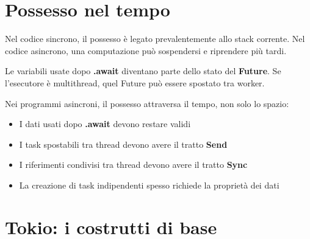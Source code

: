 \section{Possesso nel tempo}

Nel codice sincrono, il possesso è legato prevalentemente allo stack corrente.
Nel codice asincrono, una computazione può sospendersi e riprendere più tardi.

Le variabili usate dopo \textbf{.await} diventano parte dello stato del \textbf{Future}.
Se l'esecutore è multithread, quel Future può essere spostato tra worker.


Nei programmi asincroni, il possesso attraversa il tempo, non solo lo spazio:

\begin{itemize}
  \item I dati usati dopo \textbf{.await} devono restare validi
  \item I task spostabili tra thread devono avere il tratto \textbf{Send}
  \item I riferimenti condivisi tra thread devono avere il tratto \textbf{Sync}
  \item La creazione di task indipendenti spesso richiede la proprietà dei dati
\end{itemize}

\section{Tokio: i costrutti di base}




